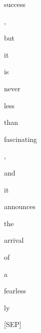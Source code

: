 \documentclass[varwidth=150mm]{standalone}
\begin{document}
\begin{CJK*}{UTF8}{gbsn}
{{{\colorbox{red!1.309739112854004}{\strut success} \colorbox{red!0.0}{\strut ,} \colorbox{red!0.0}{\strut but} \colorbox{red!2.0645625591278076}{\strut it} \colorbox{red!2.2713065147399902}{\strut is} \colorbox{red!2.532810926437378}{\strut never} \colorbox{red!0.0}{\strut less} \colorbox{red!0.0}{\strut than} \colorbox{red!6.203872203826904}{\strut fascinating} \colorbox{red!0.0}{\strut ,} \colorbox{red!13.99029541015625}{\strut and} \colorbox{red!5.462995529174805}{\strut it} \colorbox{red!1.9432653188705444}{\strut announces} \colorbox{red!2.649423122406006}{\strut the} \colorbox{red!11.799466133117676}{\strut arrival} \colorbox{red!2.4010415077209473}{\strut of} \colorbox{red!1.292235016822815}{\strut a} \colorbox{red!2.5284409523010254}{\strut fearless}\colorbox{red!11.568697929382324}{\strut ly} \colorbox{red!1.756316900253296}{\strut [SEP]}
}}}
\end{CJK*}
\end{document}
